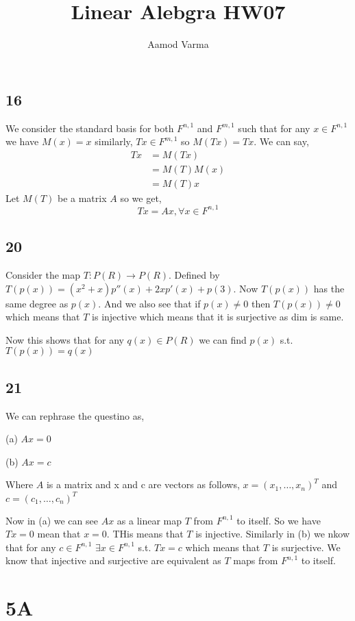 \documentclass[a4paper]{report}
\title{Linear Alebgra HW07}
\author{Aamod Varma}
\begin{document}
\maketitle
\date{}

\subsection*{16}
We consider the standard basis for both $F^{n,1}$ and $F^{m,1}$ such that for any $x \in F^{n,1}$ we have  $M(x) = x$ similarly,  $Tx \in F^{m,1}$ so $M(Tx) = Tx$. We can say,  
\begin{align*}
    Tx &= M(Tx)\\
       &= M(T) M(x)\\
       &= M(T) x
\end{align*}
Let $M(T)$ be a matrix $A$ so we get, 
$$ Tx = Ax,\forall x \in F^{n,1} $$ 
\subsection*{20}
Consider the map $T: P(R) \rightarrow P(R)$. Defined by $T(p(x)) = (x^2 + x)p''(x) + 2xp'(x) + p(3)$. Now $T(p(x))$ has the same degree as $p(x)$. And we also see that if $p(x) \ne 0$ then $T(p(x)) \ne 0$ which means that  $T$ is injective which means that it is surjective as dim is same. 

Now this shows that for any $q(x) \in P(R)$ we can find $p(x)$ s.t. $T(p(x)) = q(x)$
\subsection*{21}
We can rephrase the questino as, 

(a) $Ax = 0 $

(b) $Ax = c$

Where  $A$ is a matrix and x and c are vectors as follows,  $x= (x_1,\dots,x_n)^T$ and $c = (c_1,\dots,c_n)^T$


Now in (a) we can see $Ax$ as a linear map $T$ from  $F^{n,1}$ to itself. So we have $Tx = 0$ mean that $x = 0$. THis means that $T$ is injective. Similarly in (b) we nkow that for any  $c \in F^{n,1}$ $\exists x \in F^{n,1}$ s.t. $Tx = c$ which means that $T$ is surjective. We know that injective and surjective are equivalent as $T$ maps from $F^{n,1}$ to itself.

\section*{5A}
\end{document}
